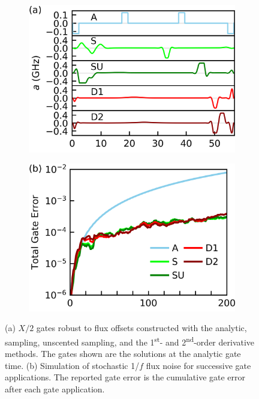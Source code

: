\documentclass[
  amsfonts,
  amsmath,
  tbtags,
  amssymb,
  aps,
  nobibnotes,
  twocolumn,
  superscriptaddress,
]{revtex4-2}
\begin{document}
\begin{figure}[ht]
  \begin{subfigure}{.4\textwidth}
    \includegraphics[width=\linewidth]{assets/f3a.png}
  \end{subfigure}\hspace{0.025\textwidth}
  \begin{subfigure}{.4\textwidth}
    \includegraphics[width=\linewidth]{assets/f3b.png}
  \end{subfigure}

  \caption{
    (a) $X/2$ gates robust to flux offsets constructed with the analytic,
    sampling, unscented sampling, and the 1\textsuperscript{st}-
    and 2\textsuperscript{nd}-order derivative methods. The gates shown
    are the solutions at the analytic gate time.
    (b) Simulation of stochastic 1/$f$ flux noise for
    successive gate applications. The reported gate error is the cumulative
    gate error after each gate application.
  }
\end{figure}
\end{document}
